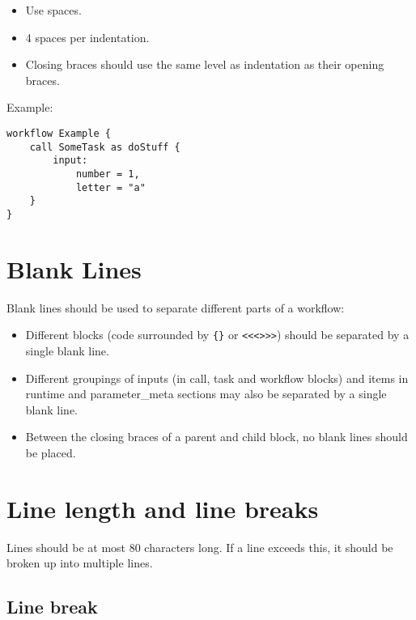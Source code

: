 \documentclass[
]{book}
\providecommand{\tightlist}{%
  \setlength{\itemsep}{0pt}\setlength{\parskip}{0pt}}
\begin{document}
\begin{itemize}
\tightlist
\item
  Use spaces.
\item
  4 spaces per indentation.
\item
  Closing braces should use the same level as indentation as their opening
  braces.
\end{itemize}

Example:

\begin{verbatim}
workflow Example {
    call SomeTask as doStuff {
        input:
            number = 1,
            letter = "a"
    }
}
\end{verbatim}

\hypertarget{blank-lines-1}{%
\section{Blank Lines}\label{blank-lines-1}}

Blank lines should be used to separate different parts of a workflow:

\begin{itemize}
\tightlist
\item
  Different blocks (code surrounded by \texttt{\{\}} or \texttt{\textless{}\textless{}\textless{}\textgreater{}\textgreater{}\textgreater{}}) should be separated by
  a single blank line.
\item
  Different groupings of inputs (in call, task and workflow blocks) and items
  in runtime and parameter\_meta sections may also be separated by a single blank line.
\item
  Between the closing braces of a parent and child block, no blank lines should
  be placed.
\end{itemize}

\hypertarget{line-length-and-line-breaks}{%
\section{Line length and line breaks}\label{line-length-and-line-breaks}}

Lines should be at most 80 characters long. If a line exceeds this, it should
be broken up into multiple lines.

\hypertarget{line-break}{%
\subsection{Line break}\label{line-break}}
\end{document}
